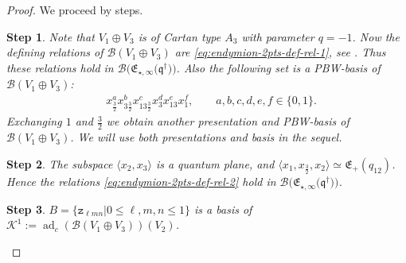 \documentclass[10pt,a4paper]{amsart}
\numberwithin{equation}{section}
\newtheorem{stepi}{Step}
\newcommand{\adc}{\operatorname{ad}_c}
\newcommand{\toba}{\mathscr B}
\newcommand{\K}{{\mathcal{K}}}
\newcommand{\zt}{\mathtt{z}}
\newcommand{\eny}{\mathfrak{E}}
\newcommand{\enyIIb}[1]{\eny_{\star,#1}}
\newcommand{\bq}{\mathfrak{q}}
\newcommand{\bqs}{\bq^{\dagger}}
\newcommand{\tresdos}{\frac{3}{2}}
\begin{document}
\begin{proof} We proceed by steps.
\begin{stepi}%
Note that $V_1\oplus V_3$ is of Cartan type $A_3$ with parameter $q= -1$. Now the defining relations of $\toba(V_1\oplus V_3)$
are \eqref{eq:endymion-2pts-def-rel-1}, see {\rm \cite{AA-diag-survey}}. Thus these relations hold in $\toba\big(\enyIIb{\infty}\big(\bqs\big)\big)$.
Also the following set is a PBW-basis of $\toba(V_1\oplus V_3)$:
\begin{align}\label{eq:Cartan-A3-PBWbasis}
& x_{\tresdos}^a x_{3\tresdos}^b x_{13\tresdos}^c x_3^d x_{13}^e x_1^f, \qquad a,b,c,d,e,f \in\{0,1\}.
\end{align}
Exchanging $1$ and $\tresdos$ we obtain another presentation and PBW-basis of $\toba(V_1\oplus V_3)$.
We will use both presentations and basis in the sequel.
\end{stepi}


\begin{stepi}%
The subspace $\langle x_2, x_3 \rangle$ is a quantum plane, and $\langle x_1,x_{\tresdos},x_2\rangle\simeq \eny_{+}(q_{12})$.
Hence the relations \eqref{eq:endymion-2pts-def-rel-2} hold in $\toba\big(\enyIIb{\infty}\big(\bqs\big)\big)$.
\end{stepi}

\begin{stepi}
$B = \{ \zt_{\ell mn} | 0\le \ell,m,n\leq 1 \}$ is a basis of $\K^1 :=\adc(\toba(V_1\oplus V_3))(V_2)$.
\end{stepi}


\end{proof}
\end{document}
